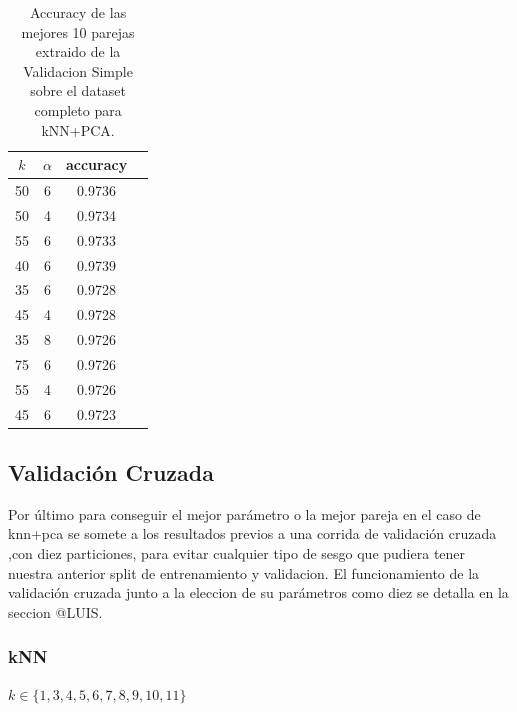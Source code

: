 \begin{table}[h!]
    \begin{center}
        \begin{tabular}{|c|c|c|c|}
        \hline
        \textbf{$k$} & \textbf{$\alpha$} & \textbf{accuracy} \\
        \hline
        50 & 6 & 0.9736\\
        50 & 4 & 0.9734\\
        55 & 6 & 0.9733\\
        40 & 6 & 0.9739\\
        35 & 6 & 0.9728\\
        45 & 4 & 0.9728\\
        35 & 8 & 0.9726\\
        75 & 6 & 0.9726\\
        55 & 4 & 0.9726\\
        45 & 6 & 0.9723\\
        
        \hline
        \end{tabular}
        \caption{Accuracy de las mejores 10 parejas extraido de la Validacion Simple sobre el dataset completo para kNN+PCA.}
        \label{knnpca_valSimple_table}
    \end{center}
\end{table}

\subsection{Validación Cruzada}

Por último para conseguir el mejor parámetro o la mejor pareja en el caso de knn+pca se somete a los resultados previos a una corrida de validación cruzada ,con diez particiones, para evitar cualquier tipo de sesgo que pudiera tener nuestra anterior split de entrenamiento y validacion. 
El funcionamiento de la validación cruzada junto a la eleccion de su parámetros como diez se detalla en la seccion @LUIS.

\subsubsection{kNN}


$ k \in \{1,3,4,5,6,7,8,9,10,11\}$


